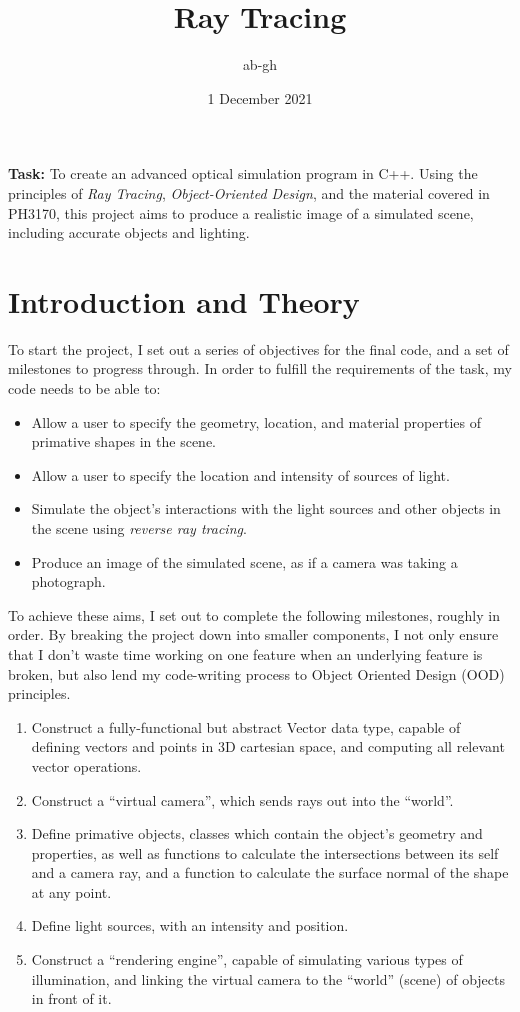 \documentclass[a4paper]{article}
\title{Ray Tracing}
\author{ab-gh}
\date{1 December 2021}
\begin{document}
\maketitle

{\bf Task:} To create an advanced optical simulation program in C++. Using the principles of {\it Ray Tracing}, {\it Object-Oriented Design}, and the material covered in PH3170, this project aims to produce a realistic image of a simulated scene, including accurate objects and lighting.

\section{Introduction and Theory}
To start the project, I set out a series of objectives for the final code, and a set of milestones to progress through. In order to fulfill the requirements of the task, my code needs to be able to:
\begin{itemize}
  \item{Allow a user to specify the geometry, location, and material properties of primative shapes in the scene.}
  \item{Allow a user to specify the location and intensity of sources of light.}
  \item{Simulate the object's interactions with the light sources and other objects in the scene using {\it reverse ray tracing}.}
  \item{Produce an image of the simulated scene, as if a camera was taking a photograph.}
\end{itemize}
To achieve these aims, I set out to complete the following milestones, roughly in order. By breaking the project down into smaller components, I not only ensure that I don't waste time working on one feature when an underlying feature is broken, but also lend my code-writing process to Object Oriented Design (OOD) principles.
\begin{enumerate}
  \item{Construct a fully-functional but abstract Vector data type, capable of defining vectors and points in 3D cartesian space, and computing all relevant vector operations.}
  \item{Construct a ``virtual camera'', which sends rays out into the ``world''.}
  \item{Define primative objects, classes which contain the object's geometry and properties, as well as functions to calculate the intersections between its self and a camera ray, and a function to calculate the surface normal of the shape at any point.}
  \item{Define light sources, with an intensity and position.}
  \item{Construct a ``rendering engine'', capable of simulating various types of illumination, and linking the virtual camera to the ``world'' (scene) of objects in front of it.}
\end{enumerate}
\end{document}
